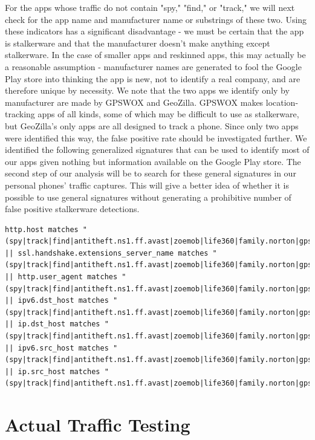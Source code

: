 \documentclass[acmtog]{acmart}
\begin{document}
For the apps whose traffic do not contain "spy," "find," or "track," we will 
next check for the app name and manufacturer name or substrings of these two. 
Using these indicators has a significant disadvantage - we must be certain that 
the app is stalkerware and that the manufacturer doesn't make anything except 
stalkerware. In the case of smaller apps and reskinned apps, this may actually 
be a reasonable assumption - manufacturer names are generated to fool the 
Google Play store into thinking the app is new, not to identify a real company, 
and are therefore unique by necessity. We note that the two apps we identify 
only by manufacturer are made by GPSWOX and GeoZilla. GPSWOX makes 
location-tracking apps of all kinds, some of which may be difficult to use as 
stalkerware, but GeoZilla's only apps are all designed to track a phone. Since 
only two apps were identified this way, the false positive rate should be 
investigated further.
We identified the following generalized signatures that can be used to identify 
most of our apps given nothing but information available on the Google Play 
store. The second step of our analysis will be to search for these general 
signatures in our personal phones' traffic captures. This will give a better 
idea of whether it is possible to use general signatures without generating a 
prohibitive number of false positive stalkerware detections.
\begin{lstlisting}
http.host matches "(spy|track|find|antitheft.ns1.ff.avast|zoemob|life360|family.norton|gpswox|geozilla)" 
|| ssl.handshake.extensions_server_name matches "(spy|track|find|antitheft.ns1.ff.avast|zoemob|life360|family.norton|gpswox|geozilla)" 
|| http.user_agent matches "(spy|track|find|antitheft.ns1.ff.avast|zoemob|life360|family.norton|gpswox|geozilla)" 
|| ipv6.dst_host matches "(spy|track|find|antitheft.ns1.ff.avast|zoemob|life360|family.norton|gpswox|geozilla)"
|| ip.dst_host matches "(spy|track|find|antitheft.ns1.ff.avast|zoemob|life360|family.norton|gpswox|geozilla)"  
|| ipv6.src_host matches "(spy|track|find|antitheft.ns1.ff.avast|zoemob|life360|family.norton|gpswox|geozilla)"
|| ip.src_host matches "(spy|track|find|antitheft.ns1.ff.avast|zoemob|life360|family.norton|gpswox|geozilla)"
\end{lstlisting}


\section{Actual Traffic Testing}
\end{document}
